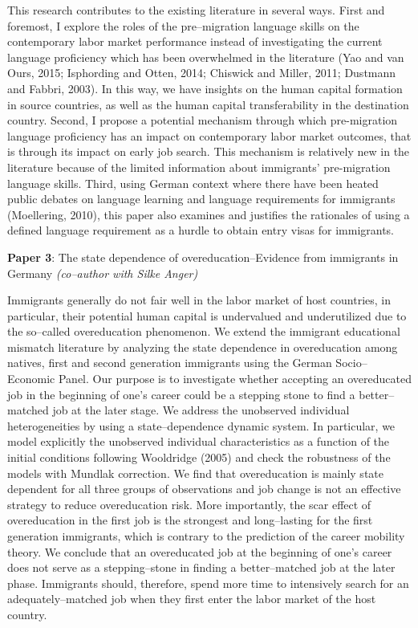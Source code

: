 \documentclass[a4paper, 10pt]{article} %
\begin{document}
This research contributes to the existing literature in several ways. First and foremost, I explore the roles of the pre--migration language skills on the contemporary labor market performance instead of investigating the current language proficiency which has been overwhelmed in the literature (Yao and van Ours, 2015; Isphording and Otten, 2014; Chiswick and Miller, 2011; Dustmann and Fabbri, 2003). In this way, we have insights on the human capital formation in source countries, as well as the human capital transferability in the destination country. Second, I propose a potential mechanism through which pre-migration language proficiency has an impact on contemporary labor market outcomes, that is through its impact on early job search. This mechanism is relatively new in the literature because of the limited information about immigrants' pre-migration language skills.  Third, using German context where there have been heated public debates on language learning and language requirements for immigrants (Moellering, 2010), this paper also examines and justifies the rationales of using a defined language requirement as a hurdle to obtain entry visas for immigrants. 

\vspace{10pt}

\textbf{Paper 3}: The state dependence of overeducation--Evidence from immigrants in Germany \textit{(co--author with Silke Anger)}

\vspace{10pt}

Immigrants generally do not fair well in the labor market of host countries, in particular, their potential human capital is undervalued and underutilized due to the so--called overeducation phenomenon. We extend the immigrant educational mismatch literature by analyzing the state dependence in overeducation among natives, first and second generation immigrants using the German Socio--Economic Panel. Our purpose is to investigate whether accepting an overeducated job in the beginning of one's career could be a stepping stone to find a better--matched job at the later stage. We address the unobserved individual heterogeneities by using a state--dependence dynamic system. In particular, we model explicitly the unobserved individual characteristics as a function of the initial conditions following Wooldridge (2005) and check the robustness of the models with Mundlak correction. We find that overeducation is mainly state dependent for all three groups of observations and job change is not an effective strategy to reduce overeducation risk. More importantly, the scar effect of overeducation in the first job is the strongest and long--lasting for the first generation immigrants, which is contrary to the prediction of the career mobility theory. We conclude that an overeducated job at the beginning of one's career does not serve as a stepping--stone in finding a better--matched job at the later phase. Immigrants should, therefore, spend more time to intensively search for an adequately--matched job when they first enter the labor market of the host country.
\end{document}
